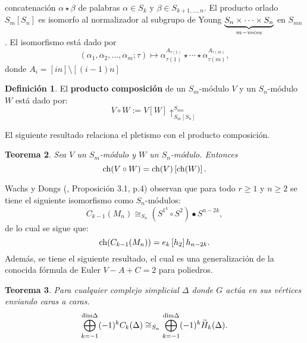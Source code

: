 \documentclass[12pt]{book}
\newtheorem{theorem}{Teorema}[section]
\theoremstyle{definition}
\newtheorem{definition}[theorem]{Definición}
\newcounter{in}
\newcounter{ini}
\begin{document}
concatenación $\alpha \star \beta$ de palabras $\alpha \in S_k$ y
$\beta \in S_{k+1, \ldots, n}$. El producto orlado
$S_m \left [ S_n \right ]$ es isomorfo al normalizador al subgrupo de
Young $\underset{m-\textup{veces}}{\underbrace{S_n \times \cdots \times S_n}}$ en
$S_{mn}$. El isomorfismo está dado por
\begin{equation}
  \label{eq:107}
  (\alpha_{1},\alpha_{2},\ldots,\alpha_{m}; \tau) \mapsto \alpha_{\tau(1)}^{A_{\tau(1)}} \star \cdots \star \alpha_{\tau(m)}^{A_{\tau(m)}},
\end{equation}
donde $A_{i} = \left [ in \right ] \setminus  \left [ (i-1)n \right ]$
\begin{definition}
  El \textbf{producto composición} de un $S_{m}$-módulo $V$ y un $S_{n}$-módulo
  $W$ está dado por:
  \begin{equation}
    \label{eq:108}
    V \circ W := V \left [ W \right ] \uparrow^{S_{mn}}_{S_m \left [ S_n \right ]}
  \end{equation}
\end{definition}
El siguiente resultado relaciona el pletismo con el producto
composición.
\begin{theorem}
  \label{cp_po}
  Sea $V$ un $S_{m}$-módulo y $W$ un $S_{n}$-módulo. Entonces
  \begin{equation}
    \label{eq:109}
    \textup{ch}(V \circ W) = \textup{ch}(V)\left [ \textup{ch}(W) \right ].
  \end{equation}
\end{theorem}
Wachs y Dongs \normalfont(\cite{dong2002combinatorial}, Proposición 3.1,
p.4) observan que para todo $r \geq 1$ y $n \geq 2$ se tiene el
siguiente isomorfismo como $S_n$-módulos:
\begin{equation}
  \label{eq:93}
  C_{k-1}(M_n) \cong_{S_{n}} (S^{1^{k}} \circ S^{2}) \bullet S^{n-2k},
\end{equation}
 de lo cual se sigue que:
\begin{equation}
  \label{eq:92}
  \textup{ch}(C_{k-1}(M_n)) = e_{k}\left [ h_{2} \right ]h_{n-2k}.
\end{equation}
Además, se tiene el siguiente resultado, el cual es una generalización de la conocida fórmula de Euler $V-A+C=2$ para poliedros.
\begin{theorem}
  \label{hopf}
  Para cualquier complejo simplicial $\Delta$ donde $G$ actúa en sus
  vértices enviando caras a caras.
  \begin{equation}
    \label{eq:110}
    \bigoplus_{k = -1}^{\textup{dim} \Delta}(-1)^{k}C_{k}(\Delta)\cong_{S_{n}} \bigoplus_{k = -1}^{\textup{dim} \Delta}(-1)^{k}\widetilde{H}_k(\Delta).
  \end{equation}
\end{theorem}
\end{document}
